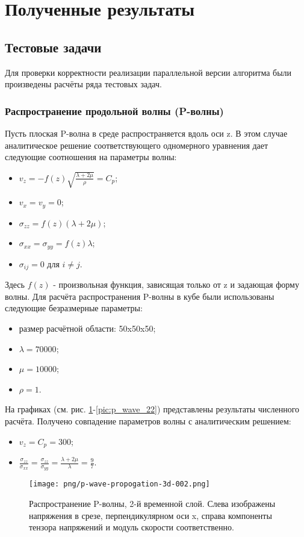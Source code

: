 \section{Полученные результаты}
\subsection{Тестовые задачи}
Для проверки корректности реализации параллельной версии алгоритма были
произведены расчёты ряда тестовых задач.
\subsubsection{Распространение продольной волны (P-волны)}
Пусть плоская P-волна в среде распространяется вдоль оси z. В этом случае аналитическое решение соответствующего одномерного уравнения дает следующие соотношения на параметры волны:
\begin{itemize}
\item $v_z=-f(z)\sqrt{\frac{\lambda+2\mu}{\rho}}=C_p$;
\item $v_x=v_y=0$;
\item $\sigma_{zz}=f(z)(\lambda+2\mu)$;
\item $\sigma_{xx}=\sigma_{yy}=f(z)\lambda$;
\item $\sigma_{ij}=0$ для $i \neq j$.
\end{itemize}
Здесь $f(z)$ - произвольная функция, зависящая только от z и задающая форму волны.
Для расчёта распространения P-волны в кубе были использованы следующие безразмерные параметры: 
\begin{itemize}
\item размер расчётной области: 50x50x50;
\item $\lambda=70000$;
\item $\mu=10000$;
\item $\rho=1$.
\end{itemize}
На графиках (см. рис.
\ref{pic:p_wave_2}-\ref{pic:p_wave_22}) представлены результаты численного расчёта. Получено совпадение параметров волны с аналитическим решением:
\begin{itemize}
\item $v_z=C_p=300$;
\item $\frac{\sigma_{zz}}{\sigma_{xx}}=\frac{\sigma_{zz}}{\sigma_{yy}}=\frac{\lambda+2\mu}{\lambda}=\frac{9}{7}$.
\end{itemize}
\begin{figure}[htp]
\centering
\texttt{[image: png/p-wave-propogation-3d-002.png]}
\caption{Распространение P-волны, 2-й временной слой. Слева изображены
напряжения в срезе, перпендикулярном оси x, справа компоненты тензора напряжений
и модуль скорости соответственно.}
\label{pic:p_wave_2}
\end{figure}
